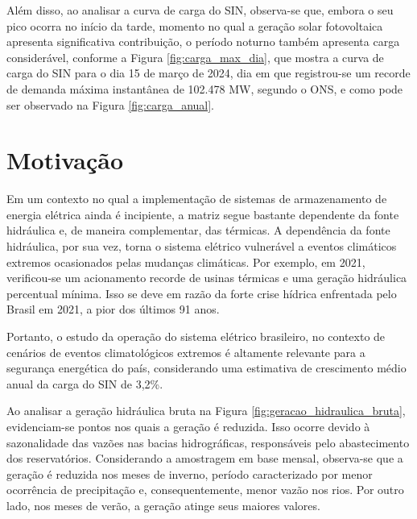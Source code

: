 Além disso, ao analisar a curva de carga do SIN, observa-se que, embora o seu pico ocorra no início da 
tarde, momento no qual a geração solar fotovoltaica apresenta significativa contribuição, o período noturno também 
apresenta carga considerável, conforme a Figura \ref{fig:carga_max_dia}, que mostra a curva de carga do SIN para o 
dia 15 de março de 2024, dia em que registrou-se um recorde de demanda máxima instantânea de 102.478 MW, segundo o ONS, 
e como pode ser observado na Figura \ref{fig:carga_anual}.

\begin{figure}[!ht]
	{}
	{}
\end{figure}

\section{Motivação}
Em um contexto no qual a implementação de sistemas de armazenamento de energia elétrica ainda é incipiente,
a matriz segue bastante dependente da fonte hidráulica e, de maneira complementar, das térmicas. A dependência da fonte
hidráulica, por sua vez, torna o sistema elétrico vulnerável a eventos climáticos extremos ocasionados pelas mudanças
climáticas. Por exemplo, em 2021, verificou-se um acionamento recorde de usinas térmicas e uma geração hidráulica 
percentual mínima. Isso se deve em razão da forte crise hídrica enfrentada pelo Brasil em 2021, a pior dos últimos 91 
anos. \cite{Soares2023}

\begin{figure}[!ht]
	{}
	{}
\end{figure}

Portanto, o estudo da operação do sistema elétrico brasileiro, no contexto de cenários de eventos
climatológicos extremos é altamente relevante para a segurança energética do país, considerando uma estimativa de 
crescimento médio anual da carga do SIN de 3,2\%. \cite{pen2024}

Ao analisar a geração hidráulica bruta na Figura \ref{fig:geracao_hidraulica_bruta}, evidenciam-se pontos nos 
quais a geração é reduzida. Isso ocorre devido à sazonalidade das vazões nas bacias hidrográficas, responsáveis pelo 
abastecimento dos reservatórios. Considerando a amostragem em base mensal, observa-se que a geração é reduzida nos meses
de inverno, período caracterizado por menor ocorrência de precipitação e, consequentemente, menor vazão nos rios. Por
outro lado, nos meses de verão, a geração atinge seus maiores valores.

